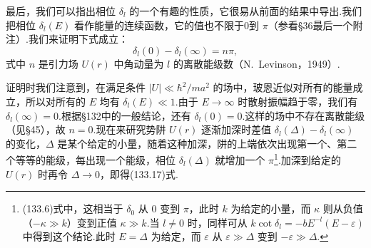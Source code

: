 最后，我们可以指出相位 $\delta_l$ 的一个有趣的性质，它很易从前面的结果中导出.我们把相位 $\delta_l(E)$ 看作能量的连续函数，它的值也不限于0到 $\pi$（参看§36最后一个附注）.我们来证明下式成立：
\begin{equation}
  \delta_l(0)-\delta_l(\infty)=n\pi,
\end{equation}
式中 $n$ 是引力场 $U(r)$ 中角动量为 $l$ 的离散能级数（N.~Levinson，1949）.

证明时我们注意到，在满足条件 $|U|\ll\hbar^2/ma^2$ 的场中，玻恩近似对所有的能量成立，所以对所有的 $E$ 均有 $\delta_l(E)\ll1$.由于 $E\to\infty$ 时散射振幅趋于零，我们有 $\delta_l(\infty)=0$.根据§132中的一般结论，还有 $\delta_l(0)=0$.这样的场中不存在离散能级（见§45），故 $n=0$.现在来研究势阱 $U(r)$ 逐渐加深时差值 $\delta_l(\Delta)-\delta_l(\infty)$ 的变化，$\Delta$ 是某个给定的小量，随着这种加深，阱的上端依次出现第一个、第二个等等的能级，每出现一个能级，相位 $\delta_l(\Delta)$ 就增加一个 $\pi$\footnote{(133.6)式中，这相当于 $\delta_0$ 从 0 变到 $\pi$，此时 $k$ 为给定的小量，而 $\kappa$ 则从负值（$-\kappa\gg k$）变到正值 $\kappa\gg k$.当 $l\neq0$ 时，同样可从 $k\cot\delta_l=-bE^{-l}(E-\varepsilon)$ 中得到这个结论.此时 $E=\Delta$ 为给定，而 $\varepsilon$ 从 $\varepsilon\gg\Delta$ 变到 $-\varepsilon\gg\Delta$.}.加深到给定的 $U(r)$ 时再令 $\Delta\to0$，即得(133.17)式.

